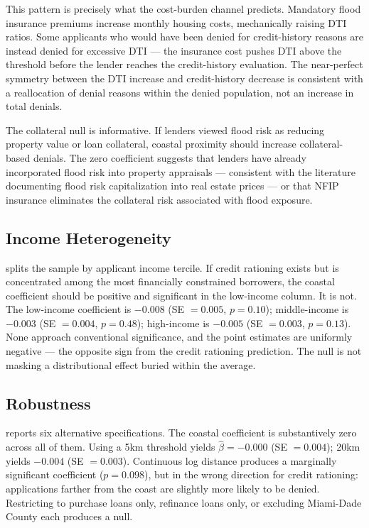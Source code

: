 \documentclass[12pt]{article}
\begin{document}


This pattern is precisely what the cost-burden channel predicts. Mandatory flood insurance premiums increase monthly housing costs, mechanically raising DTI ratios. Some applicants who would have been denied for credit-history reasons are instead denied for excessive DTI --- the insurance cost pushes DTI above the threshold before the lender reaches the credit-history evaluation. The near-perfect symmetry between the DTI increase and credit-history decrease is consistent with a reallocation of denial reasons within the denied population, not an increase in total denials.

The collateral null is informative. If lenders viewed flood risk as reducing property value or loan collateral, coastal proximity should increase collateral-based denials. The zero coefficient suggests that lenders have already incorporated flood risk into property appraisals --- consistent with the literature documenting flood risk capitalization into real estate prices \citep{bernstein2019disaster, baldauf2020does, hino2021effect, murfin2020risk} --- or that NFIP insurance eliminates the collateral risk associated with flood exposure.

\subsection{Income Heterogeneity}

 splits the sample by applicant income tercile. If credit rationing exists but is concentrated among the most financially constrained borrowers, the coastal coefficient should be positive and significant in the low-income column. It is not. The low-income coefficient is $-0.008$ (SE $= 0.005$, $p = 0.10$); middle-income is $-0.003$ (SE $= 0.004$, $p = 0.48$); high-income is $-0.005$ (SE $= 0.003$, $p = 0.13$). None approach conventional significance, and the point estimates are uniformly negative --- the opposite sign from the credit rationing prediction. The null is not masking a distributional effect buried within the average.



\subsection{Robustness}

 reports six alternative specifications. The coastal coefficient is substantively zero across all of them. Using a 5km threshold yields $\hat{\beta} = -0.000$ (SE $= 0.004$); 20km yields $-0.004$ (SE $= 0.003$). Continuous log distance produces a marginally significant coefficient ($p = 0.098$), but in the wrong direction for credit rationing: applications farther from the coast are slightly more likely to be denied. Restricting to purchase loans only, refinance loans only, or excluding Miami-Dade County each produces a null.
\end{document}
